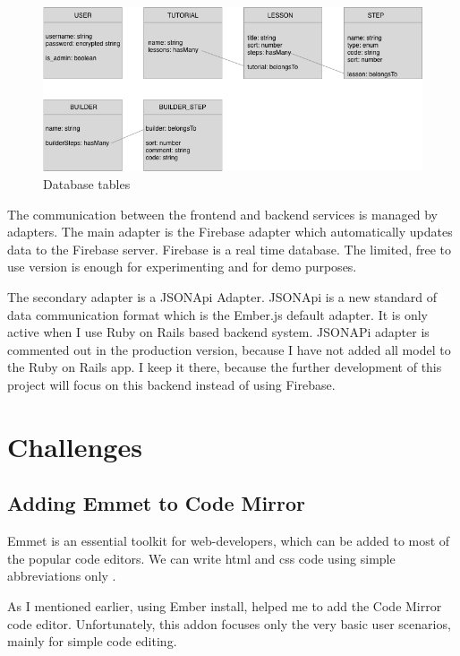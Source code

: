 \documentclass[11pt, a4paper, oneside, openright, medskipamount]{report}
\begin{document}
\begin{figure}[htbp]
\centering
\includegraphics[width=1\textwidth]{assets/database-tables}
\caption{Database tables}
\label{fig:database-tables}
\end{figure}

The communication between the frontend and backend services is managed by adapters. The main adapter is the Firebase adapter which automatically updates data to the Firebase server. Firebase is a real time database. The limited, free to use version is enough for experimenting and for demo purposes.

The secondary adapter is a JSONApi Adapter. JSONApi \cite{jsonapi} is a new standard of data communication format which is the Ember.js default adapter. It is only active when I use Ruby on Rails based backend system. JSONAPi adapter is commented out in the production version, because I have not added all model to the Ruby on Rails app. I keep it there, because the further development of this project will focus on this backend instead of using Firebase.

\section{Challenges}

\subsection{Adding Emmet to Code Mirror} \label{emmet}

Emmet is an essential toolkit for web-developers, which can be added to most of the popular code editors. We can write html and css code using simple abbreviations only \cite{emmet}.

As I mentioned earlier, using Ember install, helped me to add the Code Mirror code editor. Unfortunately, this addon focuses only the very basic user scenarios, mainly for simple code editing.
\end{document}
